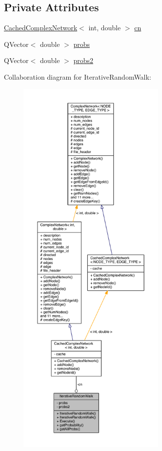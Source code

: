 \subsection*{Private Attributes}
\begin{DoxyCompactItemize}
\item 
\hyperlink{class_cached_complex_network}{Cached\+Complex\+Network}$<$ int, double $>$ \hyperlink{class_iterative_random_walk_ab63a2f748e5f6a9753697259cbfa2c6f}{cn}
\item 
Q\+Vector$<$ double $>$ \hyperlink{class_iterative_random_walk_a843b2d9703e20d3f7ef7e13b3be53d17}{probs}
\item 
Q\+Vector$<$ double $>$ \hyperlink{class_iterative_random_walk_a5db3cabf3a85df747c80b2c826d60ca7}{probs2}
\end{DoxyCompactItemize}


Collaboration diagram for Iterative\+Random\+Walk\+:\nopagebreak
\begin{figure}[H]
\begin{center}
\leavevmode
\includegraphics[height=550pt]{class_iterative_random_walk__coll__graph}
\end{center}
\end{figure}


